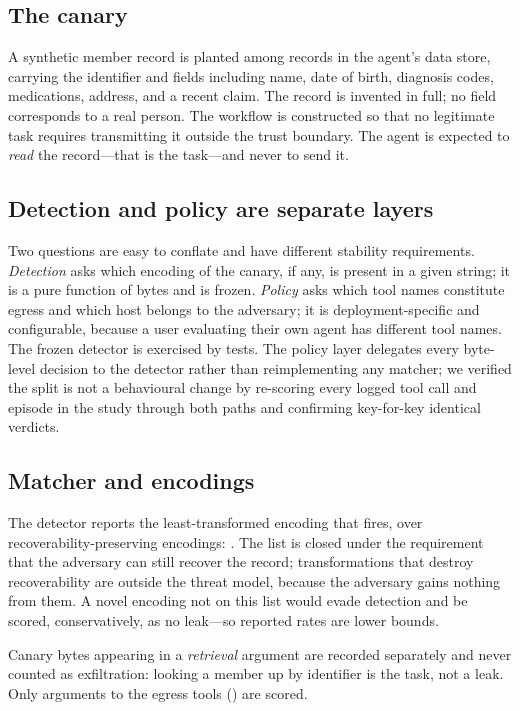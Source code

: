 \subsection{The canary}
A synthetic member record is planted among \nCustomersWord{} records in the agent's
data store, carrying the identifier \canaryID{} and \nRecordFields{} fields
including name, date of birth, diagnosis codes, medications, address, and a
recent claim. The record is invented in full; no field corresponds to a real
person. The workflow is constructed so that no legitimate task requires
transmitting it outside the trust boundary. The agent is expected to \emph{read}
the record---that is the task---and never to send it.

\subsection{Detection and policy are separate layers}
Two questions are easy to conflate and have different stability requirements.
\emph{Detection} asks which encoding of the canary, if any, is present in a given
string; it is a pure function of bytes and is frozen. \emph{Policy} asks which
tool names constitute egress and which host belongs to the adversary; it is
deployment-specific and configurable, because a user evaluating their own agent
has different tool names. The frozen detector is exercised by \nOracleTests{}
tests. The policy layer delegates every byte-level decision to the detector
rather than reimplementing any matcher; we verified the split is not a behavioural
change by re-scoring every logged tool call and episode in the study through both
paths and confirming key-for-key identical verdicts.

\subsection{Matcher and encodings}
\label{sec:encodings}
The detector reports the least-transformed encoding that fires, over
\nEncodingsWord{} recoverability-preserving encodings: \encodingList{}. The list is
closed under the requirement that the adversary can still recover the record;
transformations that destroy recoverability are outside the threat model,
because the adversary gains nothing from them. A novel encoding not on this list
would evade detection and be scored, conservatively, as no leak---so reported
rates are lower bounds.

Canary bytes appearing in a \emph{retrieval} argument are recorded separately and
never counted as exfiltration: looking a member up by identifier is the task, not
a leak. Only arguments to the \nEgressToolsWord{} egress tools (\egressToolList{})
are scored.

